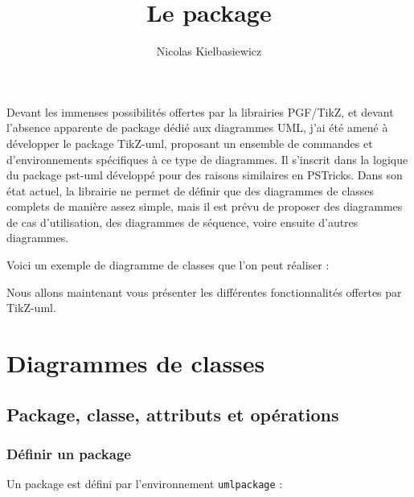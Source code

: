 \documentclass[a4paper,11pt]{report}
\title{Le package \tuml} %
\author{Nicolas {\sc Kielbasiewicz}} %
\newcommand{\inputTikZ}[1]{%
  }%
\newcommand{\inputTikZ}[1]{%
    \texttt{[image: fig/\#1.pdf]}%
  }%
\newcommand{\tuml}{{\sc TikZ-uml}}
\begin{document}
\maketitle

Devant les immenses possibilités offertes par la librairies PGF/TikZ, et devant l'absence apparente de package dédié aux diagrammes UML, j'ai été amené à développer le package \tuml, proposant un ensemble de commandes et d'environnements spécifiques à ce type de diagrammes. Il s'inscrit dans la logique du package pst-uml développé pour des raisons similaires en PSTricks. Dans son état actuel, la librairie ne permet de définir que des diagrammes de classes complets de manière assez simple, mais il est prévu de proposer des diagrammes de cas d'utilisation, des diagrammes de séquence, voire ensuite d'autres diagrammes.

Voici un exemple de diagramme de classes que l'on peut réaliser :

\begin{center}
\inputTikZ{figure1}
\end{center}

Nous allons maintenant vous présenter les différentes fonctionnalités offertes par \tuml.

\tableofcontents

\chapter{Diagrammes de classes}

\section{Package, classe, attributs et opérations}

\subsection{Définir un package}

Un package est défini par l'environnement {\tt umlpackage} :

\medskip

\begin{minipage}{0.5\textwidth}

\end{minipage}
\begin{minipage}{0.4\textwidth}
\begin{center}
\inputTikZ{figure2}
\end{center}
\end{minipage}
\end{document}
